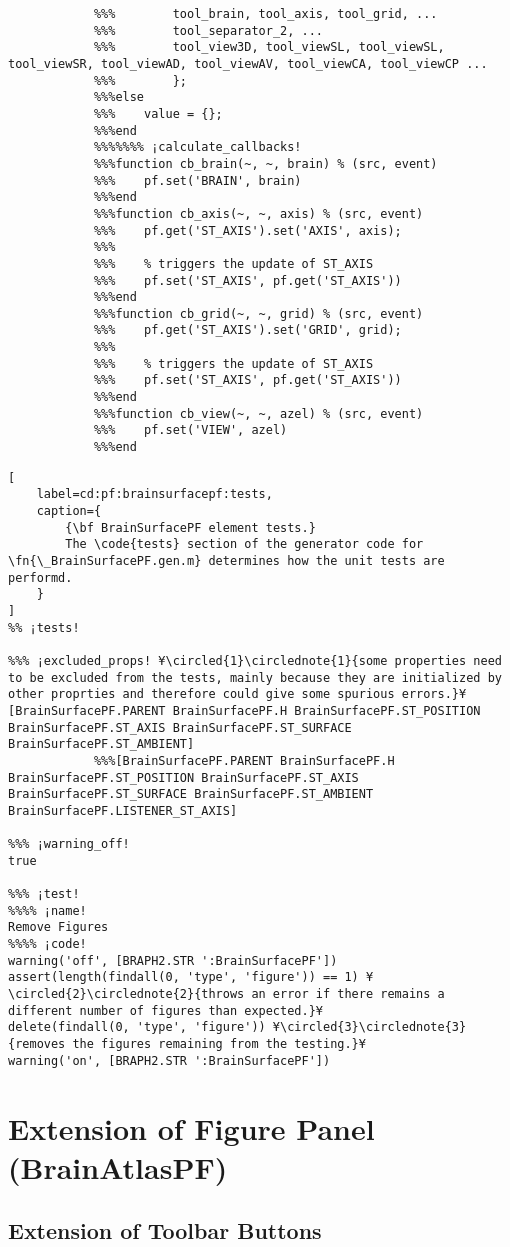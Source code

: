 \documentclass{tufte-handout}
\begin{document}
\begin{lstlisting}
            %%%        tool_brain, tool_axis, tool_grid, ...
            %%%        tool_separator_2, ...
            %%%        tool_view3D, tool_viewSL, tool_viewSL, tool_viewSR, tool_viewAD, tool_viewAV, tool_viewCA, tool_viewCP ...
            %%%        };
            %%%else
            %%%    value = {};
            %%%end
            %%%%%%% ¡calculate_callbacks!
            %%%function cb_brain(~, ~, brain) % (src, event)
            %%%    pf.set('BRAIN', brain)
            %%%end
            %%%function cb_axis(~, ~, axis) % (src, event)
            %%%    pf.get('ST_AXIS').set('AXIS', axis);
            %%%    
            %%%    % triggers the update of ST_AXIS
            %%%    pf.set('ST_AXIS', pf.get('ST_AXIS'))
            %%%end
            %%%function cb_grid(~, ~, grid) % (src, event)
            %%%    pf.get('ST_AXIS').set('GRID', grid);
            %%%
            %%%    % triggers the update of ST_AXIS
            %%%    pf.set('ST_AXIS', pf.get('ST_AXIS'))
            %%%end
            %%%function cb_view(~, ~, azel) % (src, event)
            %%%    pf.set('VIEW', azel)
            %%%end
\end{lstlisting}

\begin{lstlisting}[
	label=cd:pf:brainsurfacepf:tests,
	caption={
		{\bf BrainSurfacePF element tests.}
		The \code{tests} section of the generator code for \fn{\_BrainSurfacePF.gen.m} determines how the unit tests are performd.
	}
]
%% ¡tests!

%%% ¡excluded_props! ¥\circled{1}\circlednote{1}{some properties need to be excluded from the tests, mainly because they are initialized by other proprties and therefore could give some spurious errors.}¥
[BrainSurfacePF.PARENT BrainSurfacePF.H BrainSurfacePF.ST_POSITION BrainSurfacePF.ST_AXIS BrainSurfacePF.ST_SURFACE BrainSurfacePF.ST_AMBIENT]
            %%%[BrainSurfacePF.PARENT BrainSurfacePF.H BrainSurfacePF.ST_POSITION BrainSurfacePF.ST_AXIS BrainSurfacePF.ST_SURFACE BrainSurfacePF.ST_AMBIENT BrainSurfacePF.LISTENER_ST_AXIS] 

%%% ¡warning_off!
true

%%% ¡test!
%%%% ¡name!
Remove Figures
%%%% ¡code!
warning('off', [BRAPH2.STR ':BrainSurfacePF'])
assert(length(findall(0, 'type', 'figure')) == 1) ¥\circled{2}\circlednote{2}{throws an error if there remains a different number of figures than expected.}¥
delete(findall(0, 'type', 'figure')) ¥\circled{3}\circlednote{3}{removes the figures remaining from the testing.}¥
warning('on', [BRAPH2.STR ':BrainSurfacePF'])
\end{lstlisting}

\section{Extension of Figure Panel (BrainAtlasPF)}

\subsection{Extension of Toolbar Buttons}

%
%
\end{document}
